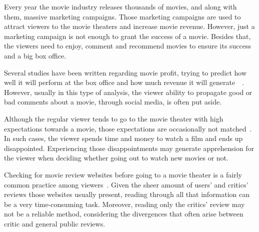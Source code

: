 Every year the movie industry releases thousands of movies, and along with them, massive marketing campaigns. Those marketing campaigns are used to attract viewers to the movie theaters and increase movie revenue. However, just a marketing campaign is not enough to grant the success of a movie. Besides that, the viewers need to enjoy, comment and recommend movies to ensure its success and a big box office. 

Several studies have been written regarding movie profit, trying to predict how well it will perform at the box office and how much revenue it will generate~\cite{2015DifferentFactors}~\cite{2014Influencesocialmedia}. However, usually in this type of analysis, the viewer ability to propagate good or bad comments about a movie, through social media, is often put aside.

Although the regular viewer tends to go to the movie theater with high expectations towards a movie, those expectations are occasionally not matched~\cite{2016EmotionsIMDB}. In such cases, the viewer spends time and money to watch a film and ends up disappointed. Experiencing those disappointments may generate apprehension for the viewer when deciding whether going out to watch new movies or not.

Checking for movie review websites before going to a movie theater is a fairly common practice among viewers~\cite{2016EmotionsIMDB}. Given the sheer amount of users' and critics' reviews those websites usually present, reading through all that information can be a very time-consuming task. Moreover, reading only the critics' review may not be a reliable method, considering the divergences that often arise between critic and general public reviews.



